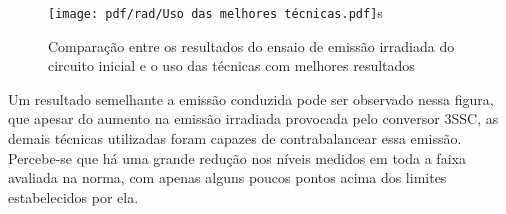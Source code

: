     \begin{figure}[H]
    	\centering
    	\caption{Comparação entre os resultados do ensaio de emissão irradiada do circuito inicial e o uso das técnicas com melhores resultados}
    	\texttt{[image: pdf/rad/Uso das melhores técnicas.pdf]}s
    	\label{fig:med_rad_todas_tec}
    \end{figure}
    
    Um resultado semelhante a emissão conduzida pode ser observado nessa figura, que apesar do aumento na emissão irradiada provocada pelo conversor 3SSC, as demais técnicas utilizadas foram capazes de contrabalancear essa emissão. Percebe-se que há uma grande redução nos níveis medidos em toda a faixa avaliada na norma, com apenas alguns poucos pontos acima dos limites estabelecidos por ela. 
    